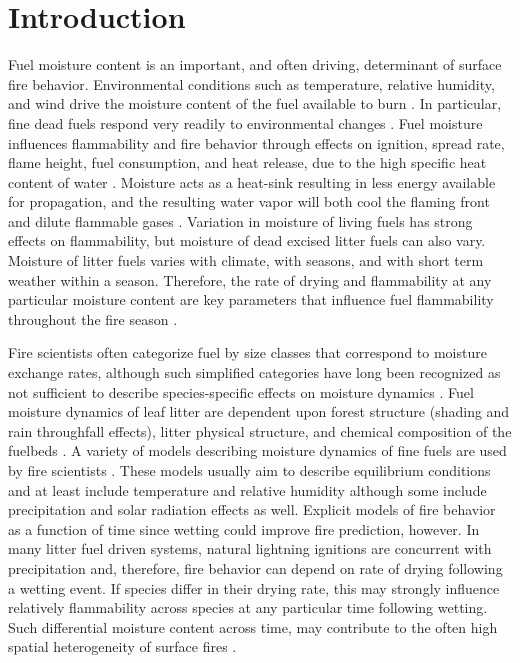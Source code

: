\documentclass[fire,article,submit,moreauthors,pdftex]{Definitions/mdpi}
\begin{document}

\section{Introduction}

Fuel moisture content is an important, and often driving, determinant of
surface fire behavior. Environmental conditions such as temperature, relative
humidity, and wind drive the moisture content of the fuel available to burn
\cite{Kreye+Varner+etal-2018}. In particular, fine dead fuels respond very
readily to environmental changes \cite{Nelson-2001}. Fuel moisture influences
flammability and fire behavior through effects on ignition, spread rate, flame
height, fuel consumption, and heat release, due to the high specific heat
content of water \cite{Rothermel-1972, Nelson-2011}. Moisture acts as a
heat-sink resulting in less energy available for propagation, and the resulting
water vapor will both cool the flaming front and dilute flammable gases
\cite{Albini-1976, Shafizadeh-1977}. Variation in moisture of living fuels has
strong effects on flammability, but moisture of dead excised litter fuels can
also vary. Moisture of litter fuels varies with climate, with seasons, and with
short term weather within a season. Therefore, the rate of drying and
flammability at any particular moisture content are key parameters that
influence fuel flammability throughout the fire season \cite{Nelson-2001}.

Fire scientists often categorize fuel by size classes that correspond to
moisture exchange rates, although such simplified categories have long been
recognized as not sufficient to describe species-specific effects on moisture
dynamics \cite{Anderson-1985}. Fuel moisture dynamics of leaf litter are
dependent upon forest structure (shading and rain throughfall effects), litter
physical structure, and chemical composition of the fuelbeds
\cite{Nelson+Hiers-2008, Matthews-2014, Kreye_Hiers_etal-2018}. A variety of
models describing moisture dynamics of fine fuels are used by fire scientists
\cite{Viney-1991, Nelson-2000, Catchpole+Catchpole+etal-2001}. These models
usually aim to describe equilibrium conditions and at least include temperature
and relative humidity although some include precipitation and solar radiation
effects as well. Explicit models of fire behavior as a function of time since
wetting could improve fire prediction, however. In many litter fuel driven
systems, natural lightning ignitions are concurrent with precipitation and,
therefore, fire behavior can depend on rate of drying following a wetting
event. If species differ in their drying rate, this may strongly influence
relatively flammability across species at any particular time following wetting.
Such differential moisture content across time, may contribute to the often
high spatial heterogeneity of surface fires \cite{Knapp_Schwilk_etal-2006,
  Kreye_Hiers_etal-2018}.
\end{document}
